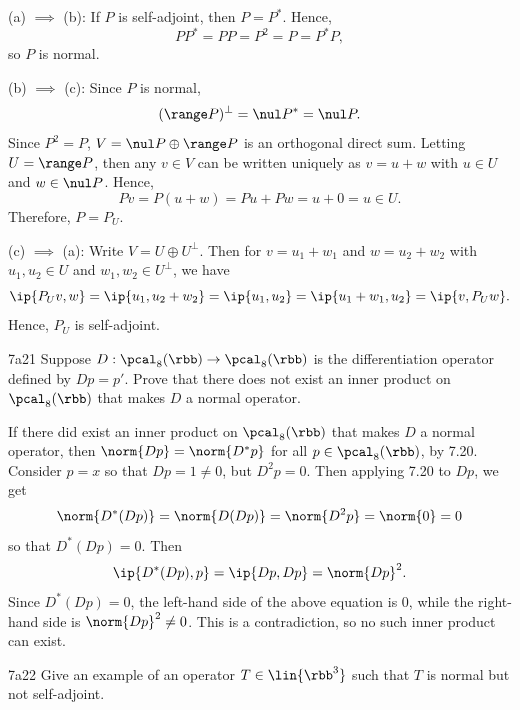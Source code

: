 \begin{sol}
    \leavevmode

    \noindent (a) $\implies$ (b):
    If $P$ is self-adjoint, then $P = P^\ast$.
    Hence,
    \[
        PP^\ast = PP = P^2 = P = P^\ast P,
    \]
    so $P$ is normal.

    \noindent (b) $\implies$ (c):
    Since $P$ is normal,
    \[
        (\range P)^\perp = \nul P^\ast = \nul P.
    \]
    Since $P^2 = P$, $V = \nul P \oplus \range P$ is an orthogonal direct sum.
    Letting $U = \range P$, then any $v \in V$ can be written uniquely as $v = u + w$ with $u \in U$ and $w \in \nul P$.
    Hence,
    \[
        Pv = P(u + w) = Pu + Pw = u + 0 = u \in U.
    \]
    Therefore, $P = P_U$.

    \noindent (c) $\implies$ (a):
    Write $V = U \oplus U^\perp$.
    Then for $v = u_1 + w_1$ and $w = u_2 + w_2$ with $u_1, u_2 \in U$ and $w_1, w_2 \in U^\perp$, we have
    \[
        \ip{P_U v, w} = \ip{u_1, u_2 + w_2} = \ip{u_1, u_2} = \ip{u_1 + w_1, u_2} = \ip{v, P_U w}.
    \]
    Hence, $P_U$ is self-adjoint.
\end{sol}

\begin{exercise}{7a21}
    Suppose $D : \pcal_8(\rbb) \to \pcal_8(\rbb)$ is the differentiation operator defined by $Dp = p'$.
    Prove that there does not exist an inner product on $\pcal_8(\rbb)$ that makes $D$ a normal operator.
\end{exercise}

\begin{sol}
    If there did exist an inner product on $\pcal_8(\rbb)$ that makes $D$ a normal operator, then $\norm{Dp} = \norm{D^\ast p}$ for all $p \in \pcal_8(\rbb)$, by 7.20.
    Consider $p = x$ so that $Dp = 1 \neq 0$, but $D^2 p = 0$.
    Then applying 7.20 to $Dp$, we get
    \[
        \norm{D^\ast (Dp)} = \norm{D(Dp)} = \norm{D^2 p} = \norm{0} = 0
    \]
    so that $D^\ast (Dp) = 0$.
    Then
    \[
        \ip{D^\ast (Dp), p} = \ip{Dp, Dp} = \norm{Dp}^2.
    \]
    Since $D^\ast (Dp) = 0$, the left-hand side of the above equation is $0$, while the right-hand side is $\norm{Dp}^2 \neq 0$.
    This is a contradiction, so no such inner product can exist.
\end{sol}

\begin{exercise}{7a22}
    Give an example of an operator $T \in \lin{\rbb^3}$ such that $T$ is normal but not self-adjoint.
\end{exercise}

